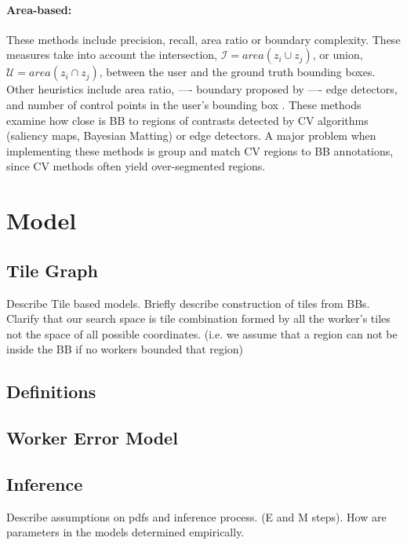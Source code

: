 \documentclass[letterpaper]{article} %
\begin{document}
\paragraph{Area-based: } These methods include precision, recall, area ratio or boundary complexity. These measures take into account the intersection, $\mathcal{I}=area(z_i\cup z_j)$, or union, $\mathcal{U}=area(z_i\cap z_j)$, between the user and the ground truth bounding boxes. Other heuristics include area ratio, ---- boundary proposed by ---- edge detectors, and number of control points in the user's bounding box \cite{Vittayakorn2011}.
 These methods examine how close is BB to regions of contrasts detected by CV algorithms (saliency maps, Bayesian Matting) or edge detectors. A major problem when implementing these methods is group and match CV regions to BB annotations, since CV methods often yield over-segmented regions.
\section{Model}
\subsection{Tile Graph} Describe Tile based models. Briefly describe construction of tiles from BBs.
Clarify that our search space is tile combination formed by all the worker's tiles not the space of all possible coordinates. (i.e. we assume that a region can not be inside the BB if no workers bounded that region) 
\subsection{Definitions}
\subsection{Worker Error Model}
\subsection{Inference}
Describe assumptions on pdfs and inference process. (E and M steps). How are parameters in the models determined empirically.
\end{document}
